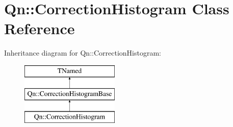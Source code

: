 \hypertarget{classQn_1_1CorrectionHistogram}{}\section{Qn\+:\+:Correction\+Histogram Class Reference}
\label{classQn_1_1CorrectionHistogram}
Inheritance diagram for Qn\+:\+:Correction\+Histogram\+:\begin{figure}[H]
\begin{center}
\leavevmode
\includegraphics[height=3.000000cm]{classQn_1_1CorrectionHistogram}
\end{center}
\end{figure}
